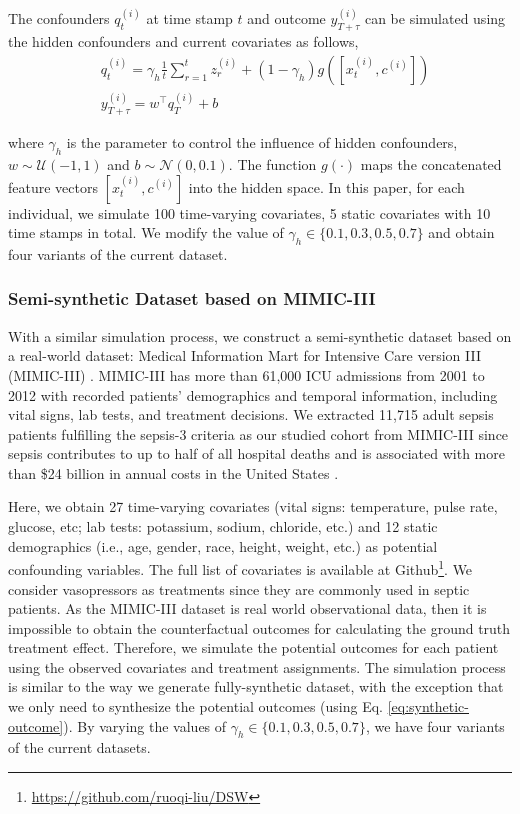 The confounders $q^{(i)}_t$ at time stamp $t$ and outcome $y^{(i)}_{T+\tau}$ can be simulated using the hidden confounders and current covariates as follows,
\begin{equation}
\label{eq:synthetic-outcome}
\begin{aligned}
& q^{(i)}_t = \gamma_{h}\frac{1}{t}\sum_{r=1}^{t}z^{(i)}_{r} + (1-\gamma_{h})g([x^{(i)}_t,c^{(i)}])\\
& y^{(i)}_{T+\tau} = w^{\top}q^{(i)}_{T}+b
\end{aligned}
\end{equation}
    
where $\gamma_{h}$ is the parameter to control the influence of hidden confounders, $w\sim\mathcal{U}(-1,1)$ and $b\sim\mathcal{N}(0,0.1)$. The function $g(\cdot)$ maps the concatenated feature vectors $[x^{(i)}_t,c^{(i)}]$ into the hidden space. In this paper, for each individual, we simulate 100 time-varying covariates, 5 static covariates with 10 time stamps in total. We modify the value of $\gamma_{h}\in\{0.1, 0.3,0.5,0.7\}$ and obtain four variants of the current dataset. 

\subsubsection{Semi-synthetic Dataset based on MIMIC-III}
With a similar simulation process, we construct a semi-synthetic dataset based on a real-world dataset: Medical Information Mart for Intensive Care version III (MIMIC-III) \cite{johnson2016mimic}. MIMIC-III has more than 61,000 ICU admissions from 2001 to 2012 with recorded patients’ demographics and temporal information, including vital signs, lab tests, and treatment decisions. We extracted 11,715 adult sepsis patients fulfilling the sepsis-3 criteria \cite{sepsis3} as our studied cohort from MIMIC-III since sepsis contributes to up to half of all hospital deaths and is associated with more than \$24 billion in annual costs in the United States \cite{liu2014hospital}.


Here, we obtain 27 time-varying covariates (vital signs: temperature, pulse rate, glucose, etc; lab tests: potassium, sodium, chloride, etc.) and 12 static demographics (i.e., age, gender, race, height, weight, etc.) as potential confounding variables. The full list of covariates is available at Github\footnote{\url{https://github.com/ruoqi-liu/DSW}}. We consider vasopressors as treatments since they are commonly used in septic patients. As the MIMIC-III dataset is real world observational data, then it is impossible to obtain the counterfactual outcomes for calculating the ground truth treatment effect. Therefore, we simulate the potential outcomes for each patient using the observed covariates and treatment assignments. The simulation process is similar to the way we generate fully-synthetic dataset, with the exception that we only need to synthesize the potential outcomes (using Eq. \ref{eq:synthetic-outcome}). By varying the values of $\gamma_h\in\{0.1, 0.3, 0.5, 0.7\}$, we have four variants of the current datasets.


